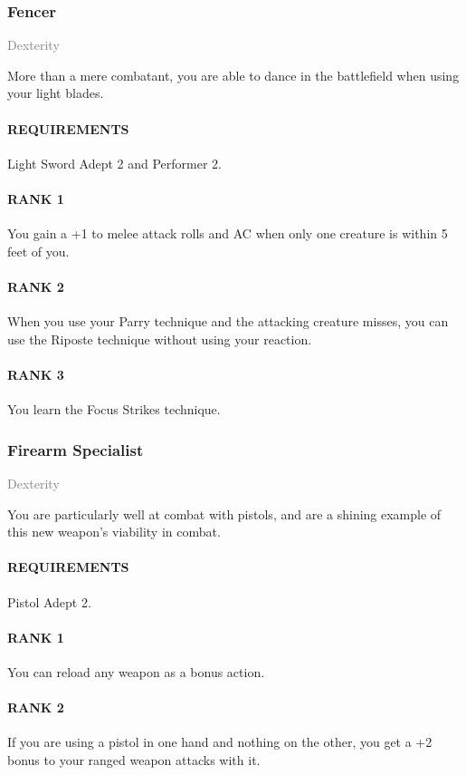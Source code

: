 \subsubsection{Fencer} \label{tal::fencer}
\small{\textcolor{gray}{Dexterity}}

\normalsize
More than a mere combatant, you are able to dance in the battlefield when using your light blades.
\paragraph{REQUIREMENTS} Light Sword Adept 2 and Performer 2.
\paragraph{RANK 1} You gain a +1 to melee attack rolls and AC when only one creature is within 5 feet of you.
\paragraph{RANK 2} When you use your Parry technique and the attacking creature misses, you can use the Riposte technique without using your reaction.
\paragraph{RANK 3} You learn the Focus Strikes technique.

\subsubsection{Firearm Specialist} \label{tal::firearmspecialist}
\small{\textcolor{gray}{Dexterity}}

\normalsize
You are particularly well at combat with pistols, and are a shining example of this new weapon's viability in combat.
\paragraph{REQUIREMENTS} Pistol Adept 2.
\paragraph{RANK 1} You can reload any weapon as a bonus action.
\paragraph{RANK 2} If you are using a pistol in one hand and nothing on the other, you get a +2 bonus to your ranged weapon attacks with it.
